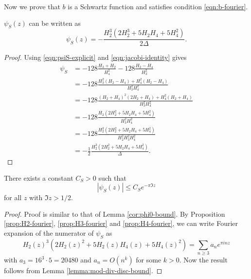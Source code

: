 Now we prove that $b$ is a Schwartz function and satisfies condition \eqref{eqn:b-fourier}.

\begin{lemma}\label{lemma:psiS-new}
$\psi_S(z)$ can be written as
\begin{equation}\label{eqn:psiS-new}
    \psi_S(z) = -\frac{H_2^3 (2 H_2^3 + 5 H_2 H_4 + 5 H_4^2)}{2 \Delta}.
\end{equation}
\end{lemma}
\begin{proof}
Using \eqref{eqn:psiS-explicit} and \eqref{eqn:jacobi-identity} gives
\begin{align}
    \psi_S &= -128 \frac{H_3 + H_2}{H_4^2} - 128 \frac{H_2 - H_4}{H_3^2} \\
    &= -128 \frac{H_3^2 (H_2 - H_4) + H_4^2 (H_2 - H_4)}{H_3^2 H_4^2} \\
    &= -128 \frac{(H_2 + H_4)^2 (2H_2 + H_4) + H_4^2(H_2 + H_4)}{H_3^2 H_4^2} \\
    &= -128 \frac{H_2 (2H_2^2 + 5 H_2 H_4 + 5 H_4^2)}{H_3^2 H_4^2} \\
    &= -128 \frac{H_2^3 (2H_2^2 + 5 H_2 H_4 + 5 H_4^2)}{H_2^2 H_3^2 H_4^2} \\
    &= - \frac{1}{2} \frac{H_2^3 (2H_2^2 + 5 H_2 H_4 + 5 H_4^2)}{\Delta}.
\end{align}
\end{proof}

\begin{lemma}\label{lemma:psiS-bound}
There exists a constant $C_S > 0$ such that
\begin{equation}\label{eqn:psiS-bound}
    |\psi_S(z)| \le C_S e^{- \pi \Im z}
\end{equation}
for all $z$ with $\Im z > 1/2$.
\end{lemma}
\begin{proof}
Proof is similar to that of Lemma \ref{cor:phi0-bound}.
By Proposition \ref{prop:H2-fourier}, \ref{prop:H3-fourier} and \ref{prop:H4-fourier}, we can write Fourier expansion of the numerator of $\psi_S$ as
\begin{equation}
    H_2(z)^3 (2 H_2(z)^2 + 5 H_2(z) H_4(z) + 5 H_4(z)^2) = \sum_{n \ge 3} a_n e^{\pi i n z}
\end{equation}
with $a_3 = 16^3 \cdot 5 = 20480$ and $a_n = O(n^k)$ for some $k > 0$.
Now the result follows from Lemma \ref{lemma:mod-div-disc-bound}.
\end{proof}


